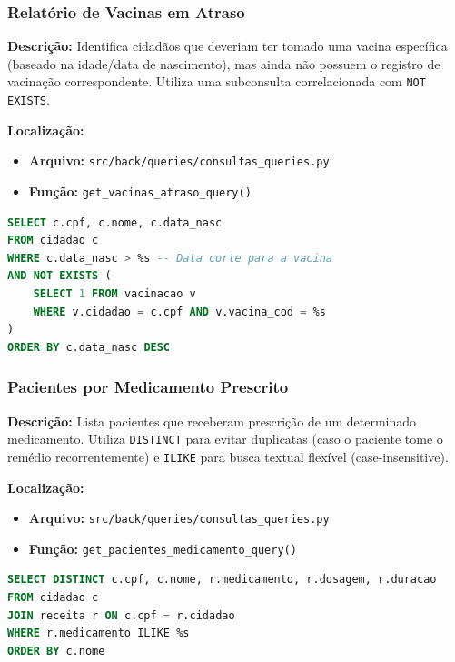 \documentclass[12pt, a4paper]{article}
\begin{document}
\subsubsection{Relatório de Vacinas em Atraso}
\textbf{Descrição:} Identifica cidadãos que deveriam ter tomado uma vacina específica (baseado na idade/data de nascimento), mas ainda não possuem o registro de vacinação correspondente. Utiliza uma subconsulta correlacionada com \texttt{NOT EXISTS}.

\noindent\textbf{Localização:}
\begin{itemize}
    \item \textbf{Arquivo:} \texttt{src/back/queries/consultas\_queries.py}
    \item \textbf{Função:} \texttt{get\_vacinas\_atraso\_query()}
\end{itemize}

\begin{lstlisting}[language=SQL, caption=Subconsulta: Vacinas Pendentes por Idade]
SELECT c.cpf, c.nome, c.data_nasc
FROM cidadao c
WHERE c.data_nasc > %s -- Data corte para a vacina
AND NOT EXISTS (
    SELECT 1 FROM vacinacao v
    WHERE v.cidadao = c.cpf AND v.vacina_cod = %s
)
ORDER BY c.data_nasc DESC
\end{lstlisting}

\subsubsection{Pacientes por Medicamento Prescrito}
\textbf{Descrição:} Lista pacientes que receberam prescrição de um determinado medicamento. Utiliza \texttt{DISTINCT} para evitar duplicatas (caso o paciente tome o remédio recorrentemente) e \texttt{ILIKE} para busca textual flexível (case-insensitive).

\noindent\textbf{Localização:}
\begin{itemize}
    \item \textbf{Arquivo:} \texttt{src/back/queries/consultas\_queries.py}
    \item \textbf{Função:} \texttt{get\_pacientes\_medicamento\_query()}
\end{itemize}

\begin{lstlisting}[language=SQL, caption=Filtro Textual: Busca de Pacientes por Remédio]
SELECT DISTINCT c.cpf, c.nome, r.medicamento, r.dosagem, r.duracao
FROM cidadao c
JOIN receita r ON c.cpf = r.cidadao
WHERE r.medicamento ILIKE %s
ORDER BY c.nome
\end{lstlisting}
\end{document}
